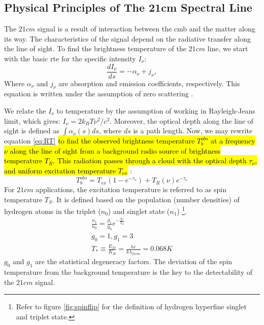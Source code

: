 \documentclass[12pt, TexShade, letterpaper]{report}
\begin{document}
\subsection{Physical Principles of The 21cm Spectral Line}
The $21cm$ signal is a result of interaction between the \gls{cmb} and the matter along its way. The characteristics of the signal depend on the radiative transfer along the line of sight. To find the brightness temperature of the $21cm$ line, we start with the basic \gls{rte} for the specific intensity $I_{\nu}$:
\begin{equation}
    \frac{dI_\nu}{ds} = - \alpha_\nu + j_\nu ,
    \label{eq:RT}
\end{equation}
Where $\alpha_\nu$ and $j_\nu$ are absorption and emission coefficients, respectively. This equation is written under the assumption of zero scattering \cite{21century, low_frequency}. \par
We relate the $I_\nu$ to temperature by the assumption of working in Rayleigh-Jeans limit, which gives: $I_\nu = 2k_B T \nu^2 /c^2$. Moreover, the optical depth along the line of sight is defined as $\int \alpha_\nu \left(s\right) ds$, where $ds$ is a path length. Now, we may rewrite equation \ref{eq:RT} \hl{to find the observed brightness temperature $T^{obs}_b$ at a frequency $\nu$ along the line of sight from a background radio source of brightness temperature $T_R$. This radiation passes through a cloud with the optical depth $\tau_\nu$, and uniform excitation temperature $T_{ex}$} \cite{21century, low_frequency}:
\begin{equation}
    T^{obs}_b = T_{ex} \left(1-e^{-\tau_\nu} \right) + T_R \left (\nu \right) e ^{-\tau_\nu} \label{eq:excitation_T}
\end{equation}
For $21cm$ applications, the excitation temperature is referred to as spin temperature $T_S$. It is defined based on the population (number densities) of hydrogen atoms in the triplet ($n_0$) and singlet state ($n_1$) \cite{21century, low_frequency} \footnote{Refer to figure \ref{fig:spinflip} for the definition of hydrogen hyperfine singlet and triplet state.}.
\begin{gather}
    \frac{n_1}{n_0} = \frac{g_1}{g_0} e ^ {-\frac{T_*}{T_S}}\\
    g_0 =1, g_1 =3\\
     T_* \equiv \frac{E_{10}}{K_B} = \frac {hc}{k\lambda_{21cm}} = 0.068 K
\end{gather}
$g_0$ and $g_1$ are the statistical degeneracy factors. The deviation of the spin temperature from the background temperature is the key to the detectability of the $21cm$ signal.\par
\end{document}
